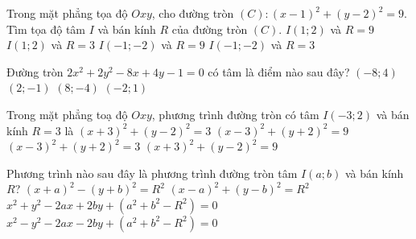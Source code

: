 

\begin{ex}%
	Trong mặt phẳng tọa độ $Oxy$, cho đường tròn $(C)\colon (x-1)^2+(y-2)^2=9$. Tìm tọa độ  tâm $I$ và bán kính $R$ của đường tròn $(C)$.
	\choice 
		 {$I(1; 2)$ và $R=9$}
		{\True $I(1; 2)$ và  $R=3$}
		 {$I(-1;-2)$ và $R=9$}
		{$I(-1;-2)$  và $R=3$}
\end{ex}

\begin{ex}%
	Đường tròn $2x^2+2y^2-8x+4y-1=0$ có tâm là  điểm nào sau đây?
	\choice 
		 {$(-8; 4)$}
		{\True  $(2;-1)$}
		{$(8;-4)$} 
		{$(-2;  1)$}
\end{ex}

\begin{ex}%
	Trong mặt phẳng toạ độ $Oxy$, phương trình đường tròn có tâm  $I(-3;2)$ và bán kính $R=3$ là
	\choice 
		{$(x+3)^2+(y-2)^2=3$} 
		 {$(x-3)^2+(y+2)^2=9$}
		 {$(x-3)^2+(y+2)^2=3$}
		 {\True $(x+3)^2+(y-2)^2=9$}
\end{ex}

\begin{ex}%
	Phương trình nào sau đây là phương trình đường tròn tâm  $I(a;b)$ và bán kính $R$?
	\choice 
		{$( x+a)^2-(y+b)^2=R^2$} 
		{\True $(  x-a)^2+(y-b)^2=R^2$}
		{$x^2+y^2-2ax+2by+(a^2+b^2-R^2)=0$} 
		{$x^2-y^2-2ax-2by+(a^2+b^2-R^2)=0$} 
\end{ex}


